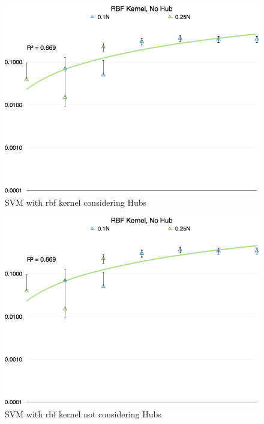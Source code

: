 \documentclass{sig-alternate-10pt}
\begin{document}
\begin{figure}
\begin{center}
\includegraphics[width=\columnwidth]{img/rbf_no_hub}
\caption{SVM with rbf kernel considering Hubs}
\label{rbf_hub}
\end{center}
\end{figure}

\begin{figure}
\begin{center}
\includegraphics[width=\columnwidth]{img/rbf_no_hub}
\caption{SVM with rbf kernel not considering Hubs}
\label{rbf_no_hub}
\end{center}
\end{figure}
\end{document}
